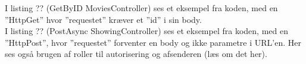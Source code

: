I listing ?? (GetByID MoviesController) ses et eksempel fra koden, 
med en ”HttpGet” hvor ”requestet” kræver et ”id” i sin body. \\

I listing ?? (PostAsync ShowingController) ses et eksempel fra koden, med en ”HttpPost”, 
hvor ”requestet” forventer en body og ikke parametre i URL’en. 
Her ses også brugen af roller til autorisering og afsenderen (læs om det her).